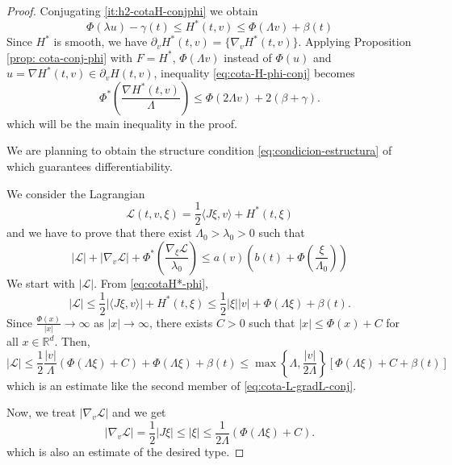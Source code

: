 \documentclass[twoside]{article}
\theoremstyle{remark}
\newcommand{\rr}{\mathbb{R}}
\renewcommand{\leq}{\leqslant}
\begin{document}
\begin{proof}
Conjugating \ref{it:h2-cotaH-conjphi} we obtain
\begin{equation}\label{eq:cotaH*-phi}
\Phi(\lambda u)-\gamma(t)\leq H^*(t,v)\leq \Phi(\Lambda v)+\beta(t)
\end{equation}
Since $H^*$ is smooth, we have $\partial_vH^*(t,v)=\{\nabla_v H^*(t,v)\}$.
Applying Proposition \ref{prop: cota-conj-phi} with $F=H^*$, $\Phi(\Lambda v)$ instead of $\Phi(u)$
and $u=\nabla H^*(t,v) \in \partial_v H(t,v)$, inequality \eqref{eq:cota-H-phi-conj} becomes
\begin{equation}\label{eq:main-phiconj-phi}
\Phi^*\left(\frac{\nabla H^*(t,v)}{\Lambda}\right)\leq \Phi(2\Lambda v)+2(\beta+\gamma).
\end{equation}
which will be the main inequality in the proof.

We are planning to obtain  the structure condition \eqref{eq:condicion-estructura} of \cite{MA2017} which guarantees
differentiability. 

We consider the Lagrangian 
\begin{equation}
\mathcal{L}(t,v,\xi)=\frac{1}{2}\langle J\xi,v\rangle + H^*(t,\xi)
\end{equation}
and we have to prove that there exist $\Lambda_0>\lambda_0>0$
such that 
\begin{equation}\label{eq:cota-L-gradL-conj}
|\mathcal{L}|+|\nabla_v\mathcal{L}|+\Phi^*\left(\frac{\nabla_{\xi}\mathcal{L}}{\lambda_0}\right)\leq
a(v)\left(b(t)+\Phi\left(\frac{\xi}{\Lambda_0}\right)\right)
\end{equation}
We start with $|\mathcal{L}|$. From \eqref{eq:cotaH*-phi}, 
\[
|\mathcal{L}|\leq \frac{1}{2} |\langle J\xi,v\rangle|+H^*(t,\xi)\leq \frac{1}{2}|\xi||v|+\Phi(\Lambda \xi)+\beta(t). 
\]
Since $\frac{\Phi(x)}{|x|}\to \infty$ as $|x|\to \infty$, there exists $C>0$ such that $|x|\leq \Phi(x)+C$ for all $x \in \rr^d$.
Then, 
\[
|\mathcal{L}|\leq \frac{1}{2} \frac{|v|}{\Lambda}\left(\Phi( \Lambda \xi)+C\right)+\Phi(\Lambda \xi)+\beta(t)
\leq \max\left\{\Lambda, \frac{|v|}{2\Lambda}\right\}
\left[\Phi(\Lambda \xi)+C+\beta(t)\right]
\] 
which is an estimate like  the second member of \eqref{eq:cota-L-gradL-conj}.

Now, we treat $|\nabla_v \mathcal{L}|$ and we get
\begin{equation}\label{eq:cota-grad-v}
|\nabla_v \mathcal{L}|=\frac{1}{2}|J\xi|\leq |\xi| \leq \frac{1}{2 \Lambda}(\Phi(\Lambda \xi)+C).
\end{equation}
which is also an estimate of the desired type.


\end{proof}
\end{document}
